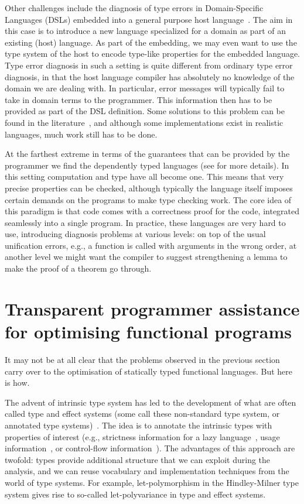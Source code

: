 \documentclass[sigplan,10pt,noacm]{acmart}
\begin{document}
Other challenges include the diagnosis of type errors in 
Domain-Specific Languages (DSLs) embedded into a general purpose host 
language~\cite{hudak96building}.
The aim in this case is to introduce a new language specialized for a domain
as part of an existing (host) language. As part of the embedding, we may
even want to use the type system of the host to encode type-like properties
for the embedded language. Type error diagnosis in such a setting is quite
different from ordinary type error diagnosis, in that the host language
compiler has absolutely no knowledge of the domain we are dealing with. In
particular, error messages will typically fail to take in domain 
terms to the programmer. This information then has to be provided as part of 
the DSL definition. Some solutions
to this problem can be found in the literature~\cite{serrano16twostage}, 
and although some
implementations exist in realistic languages, much work still has to be done.

At the farthest extreme in terms of the guarantees that can be provided
by the programmer we find the dependently typed languages (see \cite{wouter}
for more details). In this setting computation and type have all become one.
This means that very precise properties can be checked, although
typically the language itself imposes certain demands on the programs to 
make type checking work. The core idea of this paradigm is that code 
comes with a correctness proof for the code, integrated
seamlessly into a single program. In practice, these languages are very hard to
use, introducing diagnosis problems at various levels: on top of the 
usual unification errors, e.g., a function is called with arguments
in the wrong order, at another level we might want the compiler
to suggest strengthening a lemma to make the proof of a theorem go through. 

\section{Transparent programmer assistance for optimising functional programs}

It may not be at all clear that the problems observed in the previous
section carry over to the optimisation of statically typed functional
languages. But here is how.

The advent of intrinsic type system has led to the development of what
are often called type and effect systems (some call these non-standard
type system, or annotated type systems)~\cite{lucassen88effectsystems}. The idea is to
annotate the intrinsic types
with properties of interest (e.g., strictness information for a lazy
language~\cite{holdermans11makingstricterness-jnl}, usage information~\cite{hage07generic}, 
or control-flow information~\cite{holdermans10higherranked}).
The advantages of this approach are twofold: types provide 
additional structure that we can exploit during the analysis, 
and we can reuse vocabulary and implementation techniques from the world of 
type systems. For example,
let-polymorphism in the Hindley-Milner type system gives rise
to so-called let-polyvariance in type and effect systems. 
\end{document}
